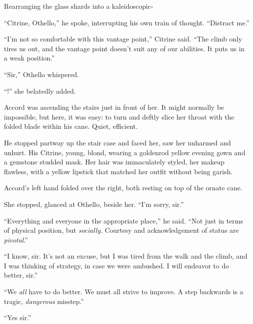 Rearranging the glass shards into a kaleidoscopic-



``Citrine, Othello,'' he spoke, interrupting his own train of thought.  ``Distract me.''



``I'm not so comfortable with this vantage point,'' Citrine said.  ``The climb only tires us out, and the vantage point doesn't suit any of our abilities.  It puts us in a weak position.''



``Sir,'' Othello whispered.



``\ldotsSir!'' she belatedly added.



Accord was ascending the stairs just in front of her.  It might normally be impossible, but here, it was easy: to turn and deftly slice her throat with the folded blade within his cane.  Quiet, efficient.



He stopped partway up the stair case and faced her, saw her unharmed and unhurt.  His Citrine, young, blond, wearing a goldenrod yellow evening gown and a gemstone studded mask.  Her hair was immaculately styled, her makeup flawless, with a yellow lipstick that matched her outfit without being garish.



Accord's left hand folded over the right, both resting on top of the ornate cane.



She stopped, glanced at Othello, beside her.  ``I'm sorry, sir.''



``Everything and everyone in the appropriate place,'' he said.  ``Not just in terms of physical position, but \emph{socially.  }Courtesy and acknowledgement of status are \emph{pivotal}.''



``I know, sir.  It's not an excuse, but I was tired from the walk and the climb, and I was thinking of strategy, in case we were ambushed.  I will endeavor to do better, sir.''



``We \emph{all} have to do better.  We must all strive to improve.  A step backwards is a tragic, \emph{dangerous} misstep.''



``Yes sir.''



